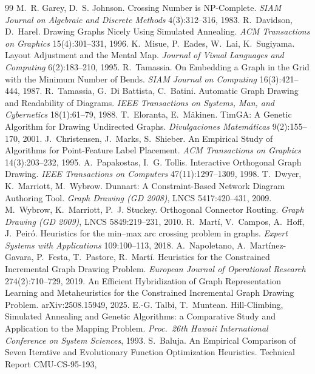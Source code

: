 \documentclass[11pt]{article}
\begin{document}
\begin{thebibliography}{99}
 M.~R. Garey, D.~S. Johnson. Crossing Number is NP-Complete. \emph{SIAM
 Journal on Algebraic and Discrete Methods} 4(3):312--316, 1983.
 R.~Davidson, D.~Harel. Drawing Graphs Nicely Using Simulated Annealing.
 \emph{ACM Transactions on Graphics} 15(4):301--331, 1996.
 K.~Misue, P.~Eades, W.~Lai, K.~Sugiyama. Layout Adjustment and the
 Mental Map. \emph{Journal of Visual Languages and Computing} 6(2):183--210, 1995.
 R.~Tamassia. On Embedding a Graph in the Grid with the Minimum Number
 of Bends. \emph{SIAM Journal on Computing} 16(3):421--444, 1987.
 R.~Tamassia, G.~Di Battista, C.~Batini. Automatic Graph Drawing and
 Readability of Diagrams. \emph{IEEE Transactions on Systems, Man, and Cybernetics}
 18(1):61--79, 1988.
 T.~Eloranta, E.~M\"akinen. TimGA: A Genetic Algorithm for Drawing
 Undirected Graphs. \emph{Divulgaciones Matem\'aticas} 9(2):155--170, 2001.
 J.~Christensen, J.~Marks, S.~Shieber. An Empirical Study of Algorithms for
 Point-Feature Label Placement. \emph{ACM Transactions on Graphics} 14(3):203--232, 1995.
 A.~Papakostas, I.~G. Tollis. Interactive Orthogonal Graph Drawing.
 \emph{IEEE Transactions on Computers} 47(11):1297--1309, 1998.
 T.~Dwyer, K.~Marriott, M.~Wybrow. Dunnart: A Constraint-Based Network
 Diagram Authoring Tool. \emph{Graph Drawing (GD 2008)}, LNCS 5417:420--431, 2009.
 M.~Wybrow, K.~Marriott, P.~J. Stuckey. Orthogonal Connector Routing.
 \emph{Graph Drawing (GD 2009)}, LNCS 5849:219--231, 2010.
 R.~Mart\'i, V.~Campos, A.~Hoff, J.~Peir\'o. Heuristics for the min--max
 arc crossing problem in graphs. \emph{Expert Systems with Applications} 109:100--113,
 2018.
 A.~Napoletano, A.~Mart\'inez-Gavara, P.~Festa, T.~Pastore, R.~Mart\'i.
 Heuristics for the Constrained Incremental Graph Drawing Problem. \emph{European Journal
 of Operational Research} 274(2):710--729, 2019.
 An Efficient Hybridization of Graph Representation Learning and
 Metaheuristics for the Constrained Incremental Graph Drawing Problem. arXiv:2508.15949,
 2025.
 E.-G. Talbi, T.~Muntean. Hill-Climbing, Simulated Annealing and
 Genetic Algorithms: a Comparative Study and Application to the Mapping Problem.
 \emph{Proc.\ 26th Hawaii International Conference on System Sciences}, 1993.
 S.~Baluja. An Empirical Comparison of Seven Iterative and
 Evolutionary Function Optimization Heuristics. Technical Report CMU-CS-95-193,

\end{thebibliography}
\end{document}
